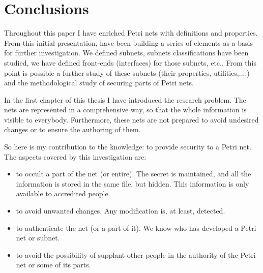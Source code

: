 
\chapter{Conclusions} %

\label{Chapter: Conclusions} %



Throughout this paper I have enriched Petri nets with definitions and properties. From this initial presentation, have been building a series of elements as a basis for further investigation. We defined subnets, subnets classifications have been studied, we have defined front-ends (interfaces) for those subnets, etc.. From this point is possible a further study of these subnets (their properties, utilities,....)
and the methodological study of securing parts of Petri nets. 

In the first chapter of this thesis I have introduced the research problem.
The nets are represented in a comprehensive way, so that the whole information is visible to everybody. Furthermore, these nets are not prepared to avoid undesired changes or to ensure the authoring of them.

So here is my contribution  to the knowledge: to provide security to a Petri net. The aspects covered by this investigation are:


\begin{itemize}
\item 
to occult a part of the net (or entire). The secret is maintained, and all the information
is stored in the same file, but hidden.
This information is only available to accredited people.
\item to avoid unwanted changes.
Any modification is, at least, detected.\item to authenticate the net (or a part of it). We know who has developed
a Petri net or subnet.
\item to avoid the possibility of supplant other people in the authority of
the Petri net or some of its parts.
\end{itemize}


